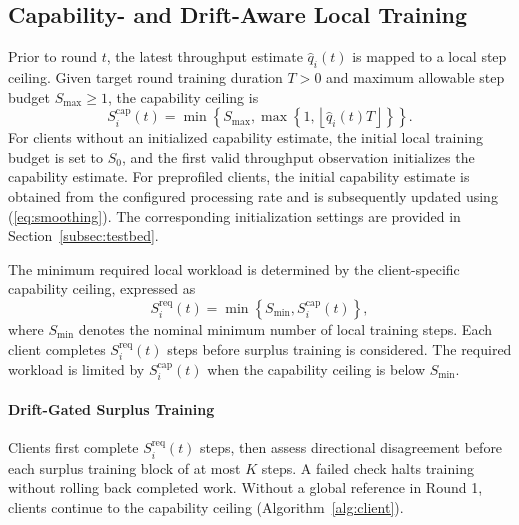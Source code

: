 \documentclass[conference]{IEEEtran}
\begin{document}
\subsection{Capability- and Drift-Aware Local Training}\label{subsec:capacity}
Prior to round $t$, the latest throughput estimate $\widehat q_i(t)$ is mapped to a local step ceiling. Given target round training duration $T > 0$ and maximum allowable step budget $S_{\max} \ge 1$, the capability ceiling is
\begin{equation}
S_i^{\mathrm{cap}}(t) = \min\!\left\{S_{\max}, \max\!\left\{1, \left\lfloor\widehat q_i(t) T\right\rfloor\right\}\right\}.
\label{eq:stepcap}
\end{equation}
For clients without an initialized capability estimate, the initial local training budget is set to $S_0$, and the first valid throughput observation initializes the capability estimate. For preprofiled clients, the initial capability estimate is obtained from the configured processing rate and
is subsequently updated using (\ref{eq:smoothing}). The corresponding
initialization settings are provided
in Section~\ref{subsec:testbed}.

The minimum required local workload is
determined by the client-specific
capability ceiling, expressed as
\begin{equation}
S_i^{\mathrm{req}}(t) =
\min\!\left\{S_{\min},
S_i^{\mathrm{cap}}(t)\right\},
\label{eq:stepreq}
\end{equation}
where $S_{\min}$ denotes the nominal
minimum number of local training steps. Each client completes $S_i^{\mathrm{req}}(t)$ steps
before surplus training is considered.
The required workload is limited by
$S_i^{\mathrm{cap}}(t)$ when the
capability ceiling is below $S_{\min}$.

\paragraph{Drift-Gated Surplus Training}
Clients first complete $S_i^{\mathrm{req}}(t)$ steps, then assess directional disagreement before each surplus training block of at most $K$ steps. A failed check halts training without rolling back completed work. Without a global reference in Round 1, clients continue to the capability ceiling (Algorithm~\ref{alg:client}).
\end{document}
